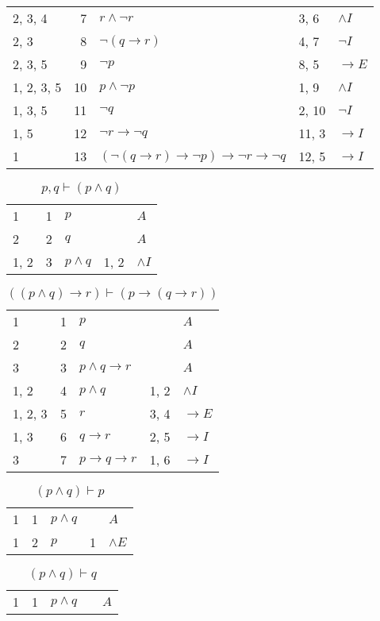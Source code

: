 \documentclass{article}
\begin{document}
\begin{table}[htbp]
\begin{tabular}{lrlll}
{2, 3, 4} & 7 & $r∧ ¬r$ & {3, 6} & $∧I$ \\
{2, 3} & 8 & $¬ (q→r)$ & {4, 7} & $¬I$ \\
{2, 3, 5} & 9 & $¬p$ & {8, 5} & $→E$ \\
{1, 2, 3, 5} & 10 & $p∧ ¬p$ & {1, 9} & $∧I$ \\
{1, 3, 5} & 11 & $¬q$ & {2, 10} & $¬I$ \\
{1, 5} & 12 & $¬r→ ¬q$ & {11, 3} & $→I$ \\
{1} & 13 & $(¬ (q→r)→ ¬p)→ ¬r→ ¬q$ & {12, 5} & $→I$ \\
\end{tabular}
\end{table}\begin{table}[htbp]\caption*{$p,q ⊢ (p ∧ q)$}\centering\begin{tabular}{lrlll}
{1} & 1 & $p$ & {} & $A$ \\
{2} & 2 & $q$ & {} & $A$ \\
{1, 2} & 3 & $p∧q$ & {1, 2} & $∧I$ \\
\end{tabular}
\end{table}\begin{table}[htbp]\caption*{$((p ∧ q) → r) ⊢ (p → (q → r))$}\centering\begin{tabular}{lrlll}
{1} & 1 & $p$ & {} & $A$ \\
{2} & 2 & $q$ & {} & $A$ \\
{3} & 3 & $p∧q→r$ & {} & $A$ \\
{1, 2} & 4 & $p∧q$ & {1, 2} & $∧I$ \\
{1, 2, 3} & 5 & $r$ & {3, 4} & $→E$ \\
{1, 3} & 6 & $q→r$ & {2, 5} & $→I$ \\
{3} & 7 & $p→q→r$ & {1, 6} & $→I$ \\
\end{tabular}
\end{table}\begin{table}[htbp]\caption*{$(p ∧ q) ⊢ p$}\centering\begin{tabular}{lrlll}
{1} & 1 & $p∧q$ & {} & $A$ \\
{1} & 2 & $p$ & {1} & $∧E$ \\
\end{tabular}
\end{table}\begin{table}[htbp]\caption*{$(p ∧ q) ⊢ q$}\centering\begin{tabular}{lrlll}
{1} & 1 & $p∧q$ & {} & $A$ \\

\end{tabular}
\end{table}
\end{document}
